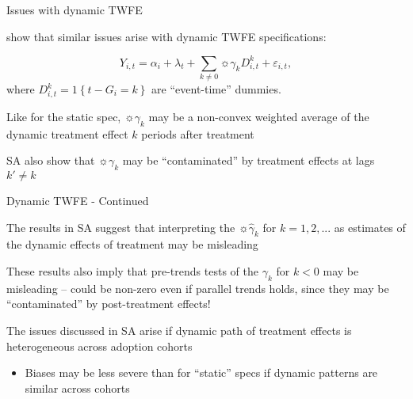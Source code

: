 \documentclass[aspectratio = 169, 13pt]{beamer}
\begin{document}
\begin{frame}{Issues with dynamic TWFE}
	\begin{wideitemize}
		\item
		\citet{sun_estimating_2020} show that similar issues arise with dynamic TWFE specifications:
		
		\begin{equation*}
			Y_{i,t} = \alpha_i + \lambda_t +  \sum_{k \neq 0} \sun{ \gamma_k D_{i,t}^{k}} + \varepsilon_{i,t},
		\end{equation*}
		where $D_{i,t}^{k} = 1\left\{t-G_{i}=k\right\}$ are ``event-time'' dummies.
		
		\item
		Like for the static spec, $\sun{\gamma_k}$ may be a non-convex weighted average of the dynamic treatment effect $k$ periods after treatment
		
		\item
		SA also show that $\sun{\gamma_k}$ may be ``contaminated'' by treatment effects at lags $k' \neq k$
		
		
	\end{wideitemize}
	
\end{frame}


\begin{frame}{Dynamic TWFE - Continued}
	
	\begin{wideitemize}
		
		\item
		The results in SA suggest that interpreting the $\sun{\hat\gamma_k}$ for $k=1,2,...$ as estimates of the dynamic effects of treatment may be misleading
		
		
		\item
		These results also imply that pre-trends tests of the $\gamma_k$ for $k<0$ may be misleading -- could be non-zero even if parallel trends holds, since they may be ``contaminated'' by post-treatment effects!
		\pause
		
		\item
		The issues discussed in SA arise if dynamic path of treatment effects is heterogeneous across adoption cohorts
		\begin{itemize}
			\item
			Biases may be less severe than for ``static'' specs if dynamic patterns are similar across cohorts
		\end{itemize}
		
		
	\end{wideitemize}
	
\end{frame}
\end{document}
